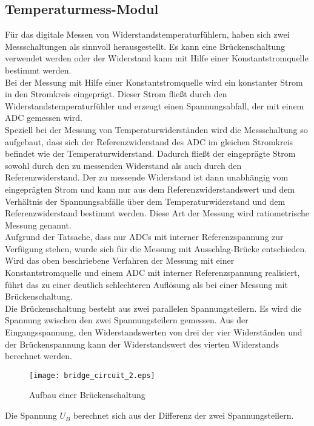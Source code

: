 \subsection{Temperaturmess-Modul}
Für das digitale Messen von Widerstandstemperaturfühlern, haben sich zwei Messschaltungen als sinnvoll herausgestellt. Es kann eine Brückenschaltung verwendet werden oder der Widerstand kann mit Hilfe einer Konstantstromquelle bestimmt werden.
\\
Bei der Messung mit Hilfe einer Konstantstromquelle wird ein konstanter Strom in den Stromkreis eingeprägt. Dieser Strom fließt durch den Widerstandstemperaturfühler und erzeugt einen Spannungsabfall, der mit einem ADC gemessen wird.
\cite[][S. 197ff]{Schruefer2012}
\\
Speziell bei der Messung von Temperaturwiderständen wird die Messschaltung so aufgebaut, dass sich der Referenzwiderstand des ADC im gleichen Stromkreis befindet wie der Temperaturwiderstand. Dadurch fließt der eingeprägte Strom sowohl durch den zu messenden Widerstand als auch durch den Referenzwiderstand. Der zu messende Widerstand ist dann unabhängig vom eingeprägten Strom und kann nur aus dem Referenzwiderstandswert und dem Verhältnis der Spannungsabfälle über dem Temperaturwiderstand und dem Referenzwiderstand bestimmt werden. Diese Art der Messung wird ratiometrische Messung genannt.
\cite{Wu2018}
\\
Aufgrund der Tatsache, dass nur ADCs mit interner Referenzspannung zur Verfügung stehen, wurde sich für die Messung mit Ausschlag-Brücke entschieden. Wird das oben beschriebene Verfahren der Messung mit einer Konstantstromquelle und einem ADC mit interner Referenzspannung realisiert, führt das zu einer deutlich schlechteren Auflösung als bei einer Messung mit Brückenschaltung.
\\
Die Brückenschaltung besteht aus zwei parallelen Spannungsteilern. Es wird die Spannung zwischen den zwei Spannungsteilern gemessen. Aus der Eingangsspannung, den Widerstandswerten von drei der vier Widerständen und der Brückenspannung kann der Widerstandswert des vierten Widerstands berechnet werden.
\cite[][S. 252ff]{Lerch2016}
\newpage
\begin{figure}[h]
\vspace{12pt}
\centering
\texttt{[image: bridge\_circuit\_2.eps]}
\caption{Aufbau einer Brückenschaltung}
\vspace{12pt}
\end{figure}
\noindent
Die Spannung \(U_B\) berechnet sich aus der Differenz der zwei Spannungsteilern.
